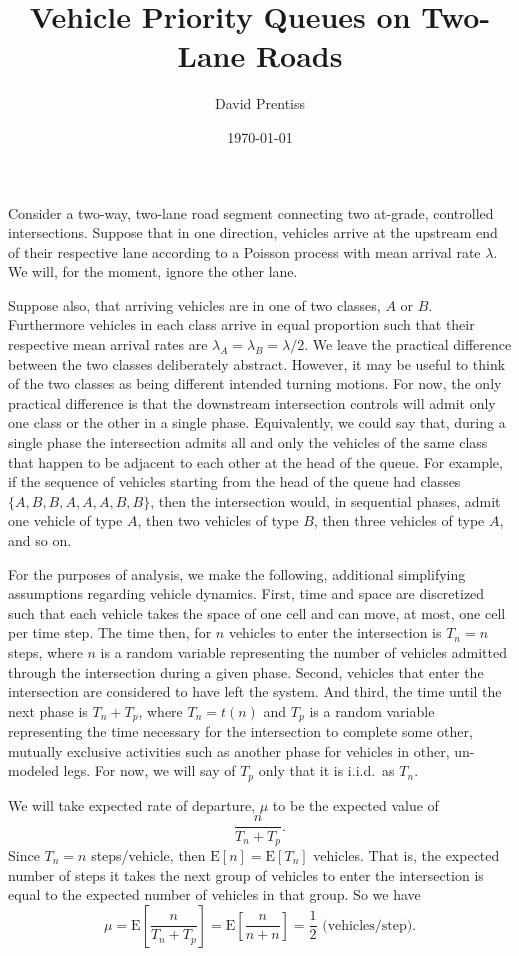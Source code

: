 \documentclass{amsart}
\begin{document}
\title{Vehicle Priority Queues on Two-Lane Roads}
\author{David Prentiss}
\date{\today}
\maketitle
Consider a two-way, two-lane road segment connecting two at-grade, controlled
intersections. Suppose that in one direction, vehicles arrive at the upstream
end of their respective lane according to a Poisson process with mean arrival
rate $\lambda$. We will, for the moment, ignore the other lane.

Suppose also, that arriving vehicles are in one of two classes, $A$ or $B$.
Furthermore vehicles in each class arrive in equal proportion such that their
respective mean arrival rates are $\lambda_A=\lambda_B=\lambda/2$.
We leave the practical difference between the two classes deliberately abstract. However,
it may be useful to think of the two classes as being different intended turning motions.
For now, the only practical difference is that the downstream intersection
controls will admit only one class or the other in a single phase. Equivalently,
we could say that, during a single phase the intersection admits all and only
the vehicles of the same class that happen to be adjacent to each other at the
head of the queue. For example, if the sequence of vehicles starting from the head of the
queue had classes $\{A,B,B,A,A,A,B,B\}$, then the intersection would, in sequential
phases, admit one vehicle of type $A$, then two vehicles of type $B$, then three vehicles
of type $A$, and so on.

For the purposes of analysis, we make the following, additional simplifying
assumptions regarding vehicle dynamics.
First, time and space are discretized such that each vehicle takes the space of
one cell and can move, at most, one cell per time step.
The time then, for $n$ vehicles to enter the intersection is $T_n=n$ steps,
where $n$ is a random variable representing the number of vehicles admitted
through the intersection during a given phase.
Second, vehicles that enter the intersection are considered to have left the system.
And third, the time until the next phase is $T_n+T_p$, where $T_n = t(n)$ and $T_p$ is a random variable
representing the time necessary for the intersection to complete some other,
mutually exclusive activities such as another phase for vehicles in other,
un-modeled legs.
For now, we will say of $T_p$ only that it is i.i.d.\ as $T_n$.

We will take expected rate of departure, $\mu$ to be the expected value of
\begin{equation*}
  \frac{n}{T_n+T_p}.
\end{equation*}
Since $T_n=n$ steps/vehicle, then $\text{E}[n]=\text{E}[T_n]$ vehicles.
That is, the expected number of steps it takes the next group of vehicles to enter the
intersection is equal to the expected number of vehicles in that group. So we
have
\begin{equation*}
  \mu = \text{E}\left[\frac{n}{T_n+T_p}\right]
  =\text{E}\left[\frac{n}{n+n}\right] = \frac{1}{2}\text{ (vehicles/step)}.
\end{equation*}
\end{document}
